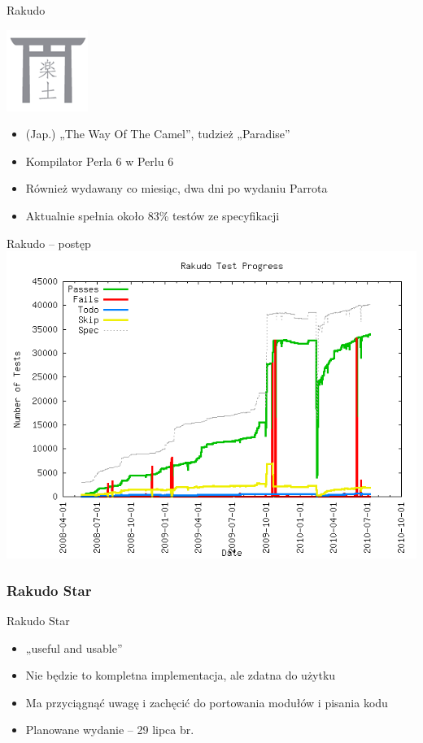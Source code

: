 \documentclass{beamer}
\begin{document}
\begin{frame}{Rakudo}
	\begin{center}
		\includegraphics[scale=0.5]{rakudo}
	\end{center}
	\begin{itemize}
		\item (Jap.) „The Way Of The Camel”, tudzież „Paradise”
		\item Kompilator Perla 6 w Perlu 6
		\item Również wydawany co miesiąc, dwa dni po wydaniu Parrota
		\item Aktualnie spełnia około 83\% testów ze specyfikacji
	\end{itemize}
\end{frame}

\begin{frame}{Rakudo -- postęp}
	\includegraphics[scale=0.3785]{progress}
\end{frame}

			\subsubsection{Rakudo Star}

\begin{frame}{Rakudo Star}
	\begin{itemize}
		\item „useful and usable”
		\item Nie będzie to kompletna implementacja, ale zdatna do użytku
		\item Ma przyciągnąć uwagę i zachęcić do portowania modułów i pisania kodu
		\item Planowane wydanie -- 29 lipca br.
	\end{itemize}
\end{frame}
\end{document}

